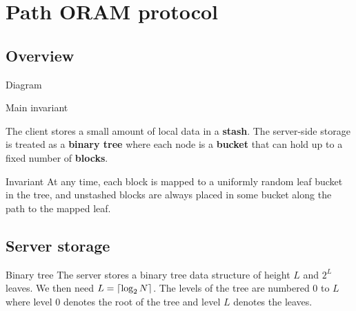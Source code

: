 
\section{Path ORAM protocol}

	\subsection{Overview}

		\begin{frame}{Diagram}
			
			

		\end{frame}

		\begin{frame}{Main invariant}
			
			The client stores a small amount of local data in a \textbf{stash}.
			The server-side storage is treated as a \textbf{binary tree} where each node is a \textbf{bucket} that can hold up to a fixed number of \textbf{blocks}.

			\begin{block}{Invariant}
				At any time, each block is mapped to a uniformly random leaf bucket in the tree, and unstashed blocks are always placed in some bucket along the path to the mapped leaf.
			\end{block}

		\end{frame}

	\subsection{Server storage}

		\begin{frame}{\subsecname}
			
			\begin{block}{Binary tree}
				The server stores a binary tree data structure of height $L$ and $2^L$ leaves.
				We then need $L = \ceil*{ \log_2 N }$. 
				The levels of the tree are numbered $0$ to $L$ where level $0$ denotes the root of the tree and level $L$ denotes the leaves.
			\end{block}

		\end{frame}

